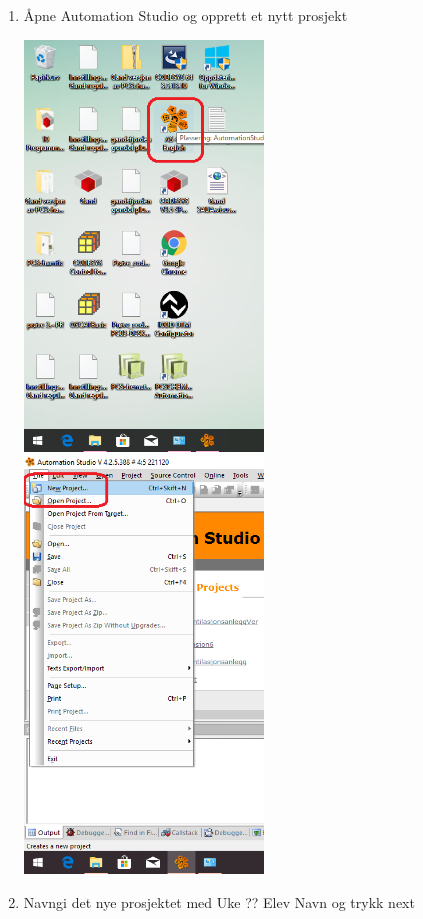 \begin{enumerate}
\item Åpne Automation Studio og opprett et nytt prosjekt

\includegraphics[width=0.5\textwidth]{stasjon07x09.png}
\includegraphics[width=0.5\textwidth]{stasjon07x01.png}

\newpage{}
\item Navngi det nye prosjektet med Uke ?? Elev Navn og trykk next


\end{enumerate}
